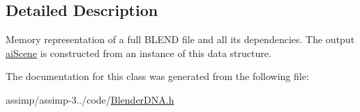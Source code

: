 \subsection{Detailed Description}
Memory representation of a full B\+L\+E\+N\+D file and all its dependencies. The output \hyperlink{structai_scene}{ai\+Scene} is constructed from an instance of this data structure. 

The documentation for this class was generated from the following file\+:\begin{DoxyCompactItemize}
\item 
assimp/assimp-\/3../code/\hyperlink{_blender_d_n_a_8h}{Blender\+D\+N\+A.\+h}\end{DoxyCompactItemize}

